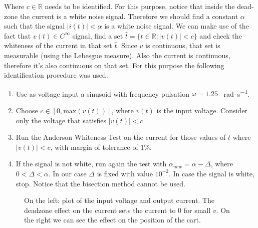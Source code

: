 Where $c \in \mathbb{R}$ needs to be identified. For this purpose, notice that inside the dead-zone the current is a white noise signal. Therefore we should find a constant $\alpha$ such that the signal $|i(t)| < \alpha$ is a white noise signal. We can make use of the fact that $v(t) \in C^{\infty}$ signal, find a set $\hat{t} = \{ t \in \mathbb{R}: |v(t)| < c \}$ and check the whiteness of the current in that set $\hat{t}$. Since $v$ is continuous, that set is measurable (using the Lebesgue measure). Also the current is continuous, therefore it's also continuous on that set. For this purpose the following identification procedure was used:
\begin{enumerate}
\item Use as voltage input a sinusoid with frequency pulsation $\omega = 1.25$ \SI{}{\radian \per \second}. 
\item Choose $c \in [0, \text{max}(v(t))]$, where $v(t)$ is the input voltage. Consider only the voltage that satisfies $|v(t)| < c$.
\item Run the Anderson Whiteness Test on the current for those values of $t$ where $|v(t)|<c$, with margin of tolerance of $1$\%.
\item {If the signal is not white, run again the test with $\alpha_{new}=\alpha-\Delta$,  where $0<\Delta < \alpha$. In our case $\Delta$ is fixed with value $10^{-2}$. In case the signal is white, stop. Notice that the bisection method cannot be used.}
\end{enumerate}
  \begin{figure}[!tbh]
  \centering
  \hfill
  \caption{On the left: plot of the input voltage and output current. The deadzone effect on the current sets the current to 0 for small $v$. On the right  we can see the effect on the position of the cart.}
    \label{fig:curposvolt}
\end{figure}
